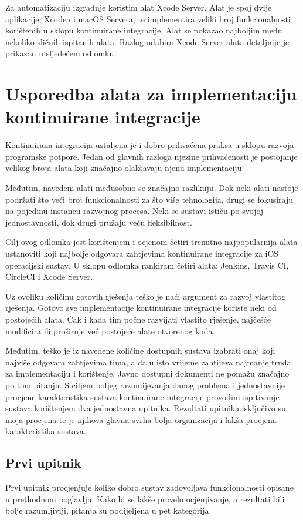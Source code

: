 \documentclass[times, utf8, diplomski, numeric]{fer}
\begin{document}
Za automatizaciju izgradnje koristim alat Xcode Server. Alat je spoj dvije aplikacije, Xcodea i macOS Servera, te implementira veliki broj funkcionalnosti korištenih u sklopu kontinuirane integracije. Alat se pokazao najboljim među nekoliko sličnih ispitanih alata. Razlog odabira Xcode Server alata detaljnije je prikazan u sljedećem odlomku.


\section{Usporedba alata za implementaciju kontinuirane integracije}

Kontinuirana integracija ustaljena je i dobro prihvaćena praksa u sklopu razvoja programske potpore. Jedan od glavnih razloga njezine prihvaćenosti je postojanje velikog broja alata koji značajno olakšavaju njenu implementaciju.

Međutim, navedeni alati međusobno se značajno razlikuju. Dok neki alati nastoje podržati što veći broj funkcionalnosti za što više tehnologija, drugi se fokusiraju na pojedinu instancu razvojnog procesa. Neki se sustavi ističu po svojoj jednostavnosti, dok drugi pružaju veću fleksibilnost.

Cilj ovog odlomka jest korištenjem i ocjenom četiri trenutno najpopularnija alata ustanoviti koji najbolje odgovara zahtjevima kontinuirane integracije za iOS operacijski sustav. U sklopu odlomka rankiram četiri alata: Jenkins, Travis CI, CircleCI i Xcode Server.

Uz ovoliku količinu gotovih rješenja teško je naći argument za razvoj vlastitog rješenja. Gotovo sve implementacije kontinuirane integracije koriste neki od postojećih alata. Čak i kada tim počne razvijati vlastito rješenje, najčešće modificira ili proširuje već postojeće alate otvorenog koda.

Međutim, teško je iz navedene količine dostupnih sustava izabrati onaj koji najviše odgovara zahtjevima tima, a da u isto vrijeme zahtijeva najmanje truda za implementaciju i korištenje. Javno dostupni dokumenti ne pomažu značajno po tom pitanju. S ciljem boljeg razumijevanja danog problema i jednostavnije procjene karakteristika sustava kontinuirane integracije provodim ispitivanje sustava korištenjem dva jednostavna upitnika. Rezultati upitnika isključivo su moja procjena te je njihova glavna svrha bolja organizacija i lakša procjena karakteristika sustava.

\subsection{Prvi upitnik}
Prvi upitnik procjenjuje koliko dobro sustav zadovoljava funkcionalnosti opisane u prethodnom poglavlju. Kako bi se lakše provelo ocjenjivanje, a rezultati bili bolje razumljiviji, pitanja su podijeljena u pet kategorija.
\end{document}

